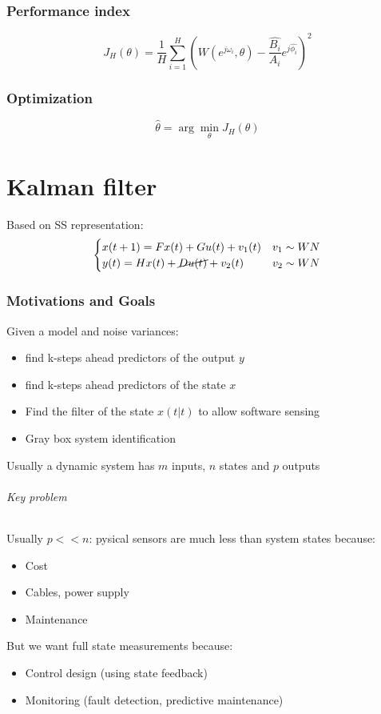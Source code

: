 \documentclass{article}
\let\OldPart\part
\renewcommand{\part}{\newpage\OldPart}
\begin{document}
\section{Performance index}
\[
J_H(\theta)=
\frac{1}{H}
\sum_{i=1}^H
\left(
W(e^{j\omega_i},\theta)
-
\frac{\hat{B_i}}{A_i}e^{j\hat{\phi_i}}
\right)^2
\]
\section{Optimization}
\[
\hat{\theta}=\arg \min_\theta J_H(\theta)
\]

\part{Kalman filter}
Based on SS representation:
\[
\begin{cases}
x(t+1)=Fx(t)+Gu(t)+v_1(t)&v_1\sim WN\\
y(t)=Hx(t)+\cancel{Du(t)}+v_2(t)&v_2\sim WN
\end{cases}
\]
\section{Motivations and Goals}
Given a model and noise variances:
\begin{itemize}
\item find k-steps ahead predictors of the output $y$
\item find k-steps ahead predictors of the state $x$
\item Find the filter of the state $\hat{x}(t|t)$ to allow software sensing
\item Gray box system identification
\end{itemize}
Usually a dynamic system has $m$ inputs, $n$ states and $p$ outputs
\paragraph{Key problem} Usually $p<<n$: pysical sensors are much less than system states because:
\begin{itemize}
\item Cost
\item Cables, power supply
\item Maintenance
\end{itemize}
But we want full state measurements because:
\begin{itemize}
\item Control design (using state feedback)
\item Monitoring (fault detection, predictive maintenance)
\end{itemize}
\end{document}
